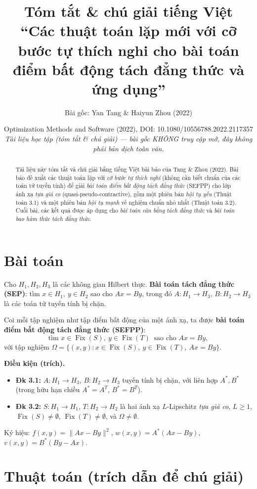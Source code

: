 \documentclass[11pt,a4paper]{article}
\title{\vspace{-1.2cm}\bfseries Tóm tắt \& chú giải tiếng Việt\\[4pt]
\large ``Các thuật toán lặp mới với cỡ bước tự thích nghi cho bài toán điểm bất động tách đẳng thức và ứng dụng''}
\author{\normalsize Bài gốc: Yan Tang \& Haiyun Zhou (2022)}
\date{\small Optimization Methods and Software (2022), DOI: 10.1080/10556788.2022.2117357\\[2pt]
\textit{Tài liệu học tập (tóm tắt \& chú giải) --- bài gốc KHÔNG truy cập mở, đây không phải bản dịch toàn văn.}}
\theoremstyle{plain}
\theoremstyle{definition}
\newcommand{\nm}[1]{\lVert #1\rVert}
\newcommand{\Fix}{\operatorname{Fix}}
\begin{document}
\maketitle

\begin{abstract}
\noindent Tài liệu này tóm tắt và chú giải bằng tiếng Việt bài báo của Tang \& Zhou (2022). Bài báo đề xuất các thuật toán lặp với \emph{cỡ bước tự thích nghi} (không cần biết chuẩn của các toán tử tuyến tính) để giải \emph{bài toán điểm bất động tách đẳng thức} (SEFPP) cho lớp ánh xạ \emph{tựa giả co} (quasi-pseudo-contractive), gồm một phiên bản \emph{hội tụ yếu} (Thuật toán 3.1) và một phiên bản \emph{hội tụ mạnh} về nghiệm chuẩn nhỏ nhất (Thuật toán 3.2). Cuối bài, các kết quả được áp dụng cho \emph{bài toán cân bằng tách đẳng thức} và \emph{bài toán bao hàm thức tách đẳng thức}.
\end{abstract}

\section{Bài toán}

Cho $H_1,H_2,H_3$ là các không gian Hilbert thực. \textbf{Bài toán tách đẳng thức (SEP)}: tìm $x\in H_1,\ y\in H_2$ sao cho $Ax=By$, trong đó $A:H_1\to H_3$, $B:H_2\to H_3$ là các toán tử tuyến tính bị chặn.

Coi mỗi tập nghiệm như tập điểm bất động của một ánh xạ, ta được \textbf{bài toán điểm bất động tách đẳng thức (SEFPP)}:
\[
\text{tìm } x\in\Fix(S),\ y\in\Fix(T)\ \text{ sao cho } Ax=By, \tag{6}
\]
với tập nghiệm $\Omega=\{(x,y):x\in\Fix(S),\ y\in\Fix(T),\ Ax=By\}$.

\medskip
\noindent\textbf{Điều kiện (trích).}
\begin{itemize}[leftmargin=1.4em,itemsep=1pt]
\item \textbf{Đk 3.1:} $A:H_1\to H_3$, $B:H_2\to H_3$ tuyến tính bị chặn, với liên hợp $A^{*},B^{*}$ (trong hữu hạn chiều $A^{*}=A^{T}$, $B^{*}=B^{T}$).
\item \textbf{Đk 3.2:} $S:H_1\to H_1$, $T:H_2\to H_2$ là hai ánh xạ $L$-Lipschitz \emph{tựa giả co}, $L\ge 1$, $\Fix(S)\ne\emptyset$, $\Fix(T)\ne\emptyset$, và $\Omega\ne\emptyset$.
\end{itemize}
\noindent Ký hiệu: $f(x,y)=\nm{Ax-By}^2$, $w(x,y)=A^{*}(Ax-By)$, $v(x,y)=B^{*}(By-Ax)$.

\section{Thuật toán (trích dẫn để chú giải)}
\end{document}
